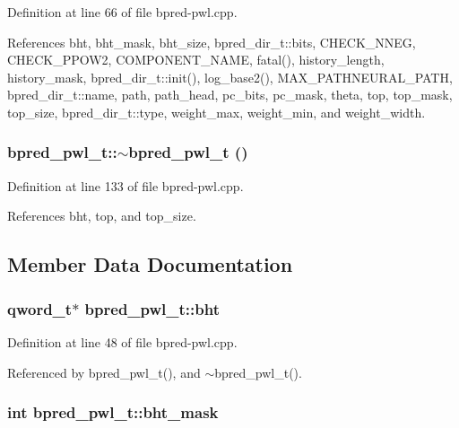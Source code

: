 Definition at line 66 of file bpred-pwl.cpp.

References bht, bht\_\-mask, bht\_\-size, bpred\_\-dir\_\-t::bits, CHECK\_\-NNEG, CHECK\_\-PPOW2, COMPONENT\_\-NAME, fatal(), history\_\-length, history\_\-mask, bpred\_\-dir\_\-t::init(), log\_\-base2(), MAX\_\-PATHNEURAL\_\-PATH, bpred\_\-dir\_\-t::name, path, path\_\-head, pc\_\-bits, pc\_\-mask, theta, top, top\_\-mask, top\_\-size, bpred\_\-dir\_\-t::type, weight\_\-max, weight\_\-min, and weight\_\-width.
\subsubsection[{$\sim$bpred\_\-pwl\_\-t}]{\setlength{\rightskip}{0pt plus 5cm}bpred\_\-pwl\_\-t::$\sim$bpred\_\-pwl\_\-t ()\hspace{0.3cm}{\tt  [inline]}}\label{classbpred__pwl__t_a8af41a3de283894717d23b1211613fc}




Definition at line 133 of file bpred-pwl.cpp.

References bht, top, and top\_\-size.

\subsection{Member Data Documentation}
\subsubsection[{bht}]{\setlength{\rightskip}{0pt plus 5cm}qword\_\-t$\ast$ {\bf bpred\_\-pwl\_\-t::bht}\hspace{0.3cm}{\tt  [protected]}}\label{classbpred__pwl__t_7cd945c0c5034e09ff65f1b602d70c8b}




Definition at line 48 of file bpred-pwl.cpp.

Referenced by bpred\_\-pwl\_\-t(), and $\sim$bpred\_\-pwl\_\-t().
\subsubsection[{bht\_\-mask}]{\setlength{\rightskip}{0pt plus 5cm}int {\bf bpred\_\-pwl\_\-t::bht\_\-mask}\hspace{0.3cm}{\tt  [protected]}}\label{classbpred__pwl__t_5e4a06b19d7a490f05aeaac3caef91f9}




